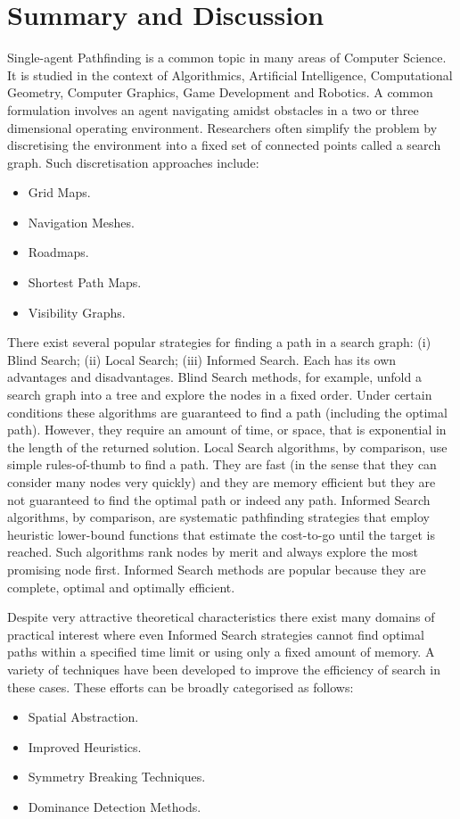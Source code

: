 \section{Summary and Discussion}
\label{cha::lit::discussion}
Single-agent Pathfinding is a common topic in many areas of Computer Science.
It is studied in the context of Algorithmics, Artificial Intelligence,
Computational Geometry, Computer Graphics, Game Development and Robotics.  A
common formulation involves an agent navigating amidst obstacles in a two or
three dimensional operating environment.  Researchers often simplify the
problem by discretising the environment into a fixed set of connected points
called a search graph. Such discretisation approaches include:
\begin{itemize}
\item Grid Maps.
\item Navigation Meshes.
\item Roadmaps.
\item Shortest Path Maps.
\item Visibility Graphs.
\end{itemize}

There exist several popular strategies for finding a path in a search graph:
(i) Blind Search; (ii) Local Search; (iii) Informed Search. Each has its own
advantages and disadvantages. Blind Search methods, for example, unfold a
search graph into a tree and explore the nodes in a fixed order. Under certain
conditions these algorithms are guaranteed to find a path (including the
optimal path). However, they require an amount of time, or space, that is
exponential in the length of the returned solution.  Local Search algorithms,
by comparison, use simple rules-of-thumb to find a path.  They are fast (in
the sense that they can consider many nodes very quickly) and they are memory
efficient but they are not guaranteed to find the optimal path or indeed any
path.  Informed Search algorithms, by comparison, are systematic pathfinding
strategies that employ heuristic lower-bound functions that estimate the
cost-to-go until the target is reached. Such algorithms rank nodes by merit
and always explore the most promising node first. Informed Search methods are
popular because they are complete, optimal and optimally efficient.

Despite very attractive theoretical characteristics there exist many domains
of practical interest where even Informed Search strategies cannot find
optimal paths within a specified time limit or using only a fixed amount of
memory. A variety of techniques have been developed to improve the efficiency
of search in these cases. These efforts can be broadly categorised as follows:
\begin{itemize}
\item Spatial Abstraction.
\item Improved Heuristics.
\item Symmetry Breaking Techniques.
\item Dominance Detection Methods.
\end{itemize}

